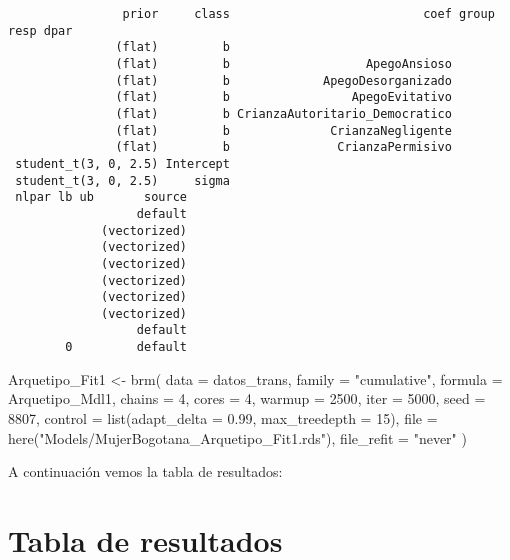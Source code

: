 \documentclass[
  letterpaper,
  DIV=11,
  numbers=noendperiod]{scrartcl}
\newenvironment{Shaded}{\begin{snugshade}}{\end{snugshade}}
\newcommand{\AttributeTok}[1]{\textcolor[rgb]{0.40,0.45,0.13}{#1}}
\newcommand{\DecValTok}[1]{\textcolor[rgb]{0.68,0.00,0.00}{#1}}
\newcommand{\FloatTok}[1]{\textcolor[rgb]{0.68,0.00,0.00}{#1}}
\newcommand{\FunctionTok}[1]{\textcolor[rgb]{0.28,0.35,0.67}{#1}}
\newcommand{\NormalTok}[1]{\textcolor[rgb]{0.00,0.23,0.31}{#1}}
\newcommand{\OtherTok}[1]{\textcolor[rgb]{0.00,0.23,0.31}{#1}}
\newcommand{\StringTok}[1]{\textcolor[rgb]{0.13,0.47,0.30}{#1}}
\begin{document}
\begin{verbatim}
                prior     class                           coef group resp dpar
               (flat)         b                                               
               (flat)         b                   ApegoAnsioso                
               (flat)         b             ApegoDesorganizado                
               (flat)         b                 ApegoEvitativo                
               (flat)         b CrianzaAutoritario_Democratico                
               (flat)         b              CrianzaNegligente                
               (flat)         b               CrianzaPermisivo                
 student_t(3, 0, 2.5) Intercept                                               
 student_t(3, 0, 2.5)     sigma                                               
 nlpar lb ub       source
                  default
             (vectorized)
             (vectorized)
             (vectorized)
             (vectorized)
             (vectorized)
             (vectorized)
                  default
        0         default
\end{verbatim}

\begin{Shaded}
\begin{Highlighting}[]
\NormalTok{Arquetipo\_Fit1 }\OtherTok{\textless{}{-}}
  \FunctionTok{brm}\NormalTok{(}
    \AttributeTok{data =}\NormalTok{ datos\_trans,}
    \AttributeTok{family =} \StringTok{"cumulative"}\NormalTok{,}
    \AttributeTok{formula =}\NormalTok{ Arquetipo\_Mdl1,}
    \AttributeTok{chains =} \DecValTok{4}\NormalTok{,}
    \AttributeTok{cores =} \DecValTok{4}\NormalTok{,}
    \AttributeTok{warmup =} \DecValTok{2500}\NormalTok{,}
    \AttributeTok{iter =} \DecValTok{5000}\NormalTok{,}
    \AttributeTok{seed =} \DecValTok{8807}\NormalTok{,}
    \AttributeTok{control =} \FunctionTok{list}\NormalTok{(}\AttributeTok{adapt\_delta =} \FloatTok{0.99}\NormalTok{, }\AttributeTok{max\_treedepth =} \DecValTok{15}\NormalTok{),}
    \AttributeTok{file =} \FunctionTok{here}\NormalTok{(}\StringTok{"Models/MujerBogotana\_Arquetipo\_Fit1.rds"}\NormalTok{),}
    \AttributeTok{file\_refit =} \StringTok{"never"}
\NormalTok{  )}
\end{Highlighting}
\end{Shaded}

A continuación vemos la tabla de resultados:

\section{Tabla de resultados}\label{tabla-de-resultados}
\end{document}
